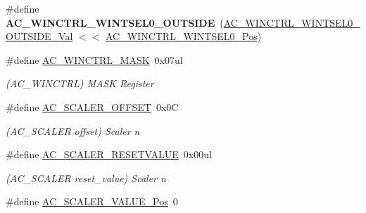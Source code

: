 \begin{DoxyCompactItemize}
\item 
\hypertarget{group___s_a_m_l21___a_c_gaaa37e49f9b8ebca7123567960a2da843}{}\#define {\bfseries A\+C\+\_\+\+W\+I\+N\+C\+T\+R\+L\+\_\+\+W\+I\+N\+T\+S\+E\+L0\+\_\+\+O\+U\+T\+S\+I\+D\+E}~(\hyperlink{group___s_a_m_l21___a_c_ga75d730dac04d0f2fdf146b55d1fe4b7f}{A\+C\+\_\+\+W\+I\+N\+C\+T\+R\+L\+\_\+\+W\+I\+N\+T\+S\+E\+L0\+\_\+\+O\+U\+T\+S\+I\+D\+E\+\_\+\+Val} $<$$<$ \hyperlink{group___s_a_m_l21___a_c_gaf7bc05aa7122fff6ea05ae690cbc8486}{A\+C\+\_\+\+W\+I\+N\+C\+T\+R\+L\+\_\+\+W\+I\+N\+T\+S\+E\+L0\+\_\+\+Pos})\label{group___s_a_m_l21___a_c_gaaa37e49f9b8ebca7123567960a2da843}

\item 
\hypertarget{group___s_a_m_l21___a_c_gaf99df28572c59d0f3105b754519a1db6}{}\#define \hyperlink{group___s_a_m_l21___a_c_gaf99df28572c59d0f3105b754519a1db6}{A\+C\+\_\+\+W\+I\+N\+C\+T\+R\+L\+\_\+\+M\+A\+S\+K}~0x07ul\label{group___s_a_m_l21___a_c_gaf99df28572c59d0f3105b754519a1db6}

\begin{DoxyCompactList}\small\item\em (A\+C\+\_\+\+W\+I\+N\+C\+T\+R\+L) M\+A\+S\+K Register \end{DoxyCompactList}\item 
\hypertarget{group___s_a_m_l21___a_c_ga35b0b56e4247a7e1de9e30ebb621cb3d}{}\#define \hyperlink{group___s_a_m_l21___a_c_ga35b0b56e4247a7e1de9e30ebb621cb3d}{A\+C\+\_\+\+S\+C\+A\+L\+E\+R\+\_\+\+O\+F\+F\+S\+E\+T}~0x0\+C\label{group___s_a_m_l21___a_c_ga35b0b56e4247a7e1de9e30ebb621cb3d}

\begin{DoxyCompactList}\small\item\em (A\+C\+\_\+\+S\+C\+A\+L\+E\+R offset) Scaler n \end{DoxyCompactList}\item 
\hypertarget{group___s_a_m_l21___a_c_ga42557feb56a587a53af8fcae1f738d4f}{}\#define \hyperlink{group___s_a_m_l21___a_c_ga42557feb56a587a53af8fcae1f738d4f}{A\+C\+\_\+\+S\+C\+A\+L\+E\+R\+\_\+\+R\+E\+S\+E\+T\+V\+A\+L\+U\+E}~0x00ul\label{group___s_a_m_l21___a_c_ga42557feb56a587a53af8fcae1f738d4f}

\begin{DoxyCompactList}\small\item\em (A\+C\+\_\+\+S\+C\+A\+L\+E\+R reset\+\_\+value) Scaler n \end{DoxyCompactList}\item 
\hypertarget{group___s_a_m_l21___a_c_ga1afb18c8a62012c570ed01f711dac8f4}{}\#define \hyperlink{group___s_a_m_l21___a_c_ga1afb18c8a62012c570ed01f711dac8f4}{A\+C\+\_\+\+S\+C\+A\+L\+E\+R\+\_\+\+V\+A\+L\+U\+E\+\_\+\+Pos}~0\label{group___s_a_m_l21___a_c_ga1afb18c8a62012c570ed01f711dac8f4}


\end{DoxyCompactItemize}
